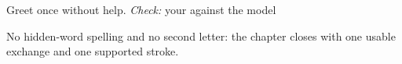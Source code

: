 \begin{tcolorbox}[breakable,colback=teal!4,colframe=teal!35!black,title={Before you move on}]
Greet once without help. \emph{Check:} your \textbf{} against the model

No hidden-word spelling and no second letter: the chapter closes with one usable exchange and one supported stroke.
\end{tcolorbox}
